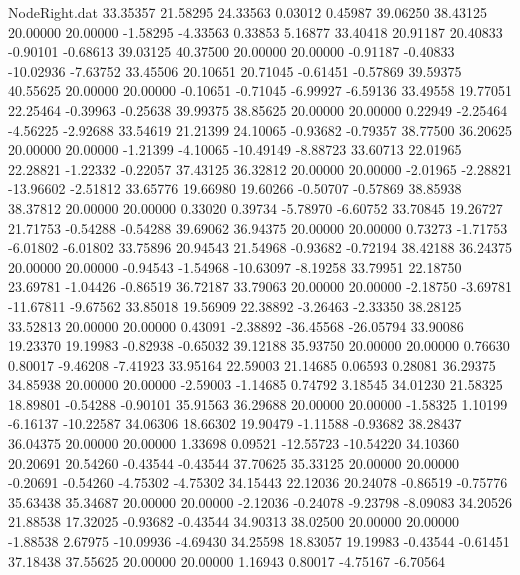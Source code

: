 \begin{filecontents}{NodeRight.dat}
  33.35357   21.58295   24.33563     0.03012    0.45987   39.06250   38.43125   20.00000   20.00000   -1.58295   -4.33563    0.33853    5.16877
  33.40418   20.91187   20.40833    -0.90101   -0.68613   39.03125   40.37500   20.00000   20.00000   -0.91187   -0.40833  -10.02936   -7.63752
  33.45506   20.10651   20.71045    -0.61451   -0.57869   39.59375   40.55625   20.00000   20.00000   -0.10651   -0.71045   -6.99927   -6.59136
  33.49558   19.77051   22.25464    -0.39963   -0.25638   39.99375   38.85625   20.00000   20.00000    0.22949   -2.25464   -4.56225   -2.92688
  33.54619   21.21399   24.10065    -0.93682   -0.79357   38.77500   36.20625   20.00000   20.00000   -1.21399   -4.10065  -10.49149   -8.88723
  33.60713   22.01965   22.28821    -1.22332   -0.22057   37.43125   36.32812   20.00000   20.00000   -2.01965   -2.28821  -13.96602   -2.51812
  33.65776   19.66980   19.60266    -0.50707   -0.57869   38.85938   38.37812   20.00000   20.00000    0.33020    0.39734   -5.78970   -6.60752
  33.70845   19.26727   21.71753    -0.54288   -0.54288   39.69062   36.94375   20.00000   20.00000    0.73273   -1.71753   -6.01802   -6.01802
  33.75896   20.94543   21.54968    -0.93682   -0.72194   38.42188   36.24375   20.00000   20.00000   -0.94543   -1.54968  -10.63097   -8.19258
  33.79951   22.18750   23.69781    -1.04426   -0.86519   36.72187   33.79063   20.00000   20.00000   -2.18750   -3.69781  -11.67811   -9.67562
  33.85018   19.56909   22.38892    -3.26463   -2.33350   38.28125   33.52813   20.00000   20.00000    0.43091   -2.38892  -36.45568  -26.05794
  33.90086   19.23370   19.19983    -0.82938   -0.65032   39.12188   35.93750   20.00000   20.00000    0.76630    0.80017   -9.46208   -7.41923
  33.95164   22.59003   21.14685     0.06593    0.28081   36.29375   34.85938   20.00000   20.00000   -2.59003   -1.14685    0.74792    3.18545
  34.01230   21.58325   18.89801    -0.54288   -0.90101   35.91563   36.29688   20.00000   20.00000   -1.58325    1.10199   -6.16137  -10.22587
  34.06306   18.66302   19.90479    -1.11588   -0.93682   38.28437   36.04375   20.00000   20.00000    1.33698    0.09521  -12.55723  -10.54220
  34.10360   20.20691   20.54260    -0.43544   -0.43544   37.70625   35.33125   20.00000   20.00000   -0.20691   -0.54260   -4.75302   -4.75302
  34.15443   22.12036   20.24078    -0.86519   -0.75776   35.63438   35.34687   20.00000   20.00000   -2.12036   -0.24078   -9.23798   -8.09083
  34.20526   21.88538   17.32025    -0.93682   -0.43544   34.90313   38.02500   20.00000   20.00000   -1.88538    2.67975  -10.09936   -4.69430
  34.25598   18.83057   19.19983    -0.43544   -0.61451   37.18438   37.55625   20.00000   20.00000    1.16943    0.80017   -4.75167   -6.70564

\end{filecontents}
